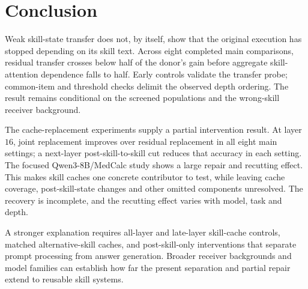 \section{Conclusion}
\label{sec:discussion}

Weak skill-state transfer does not, by itself, show that the original
execution has stopped depending on its skill text. Across eight completed main
comparisons, residual transfer crosses below half of the donor's gain
before aggregate skill-attention dependence falls to half. Early controls
validate the transfer probe; common-item and threshold checks delimit the
observed depth ordering. The result remains conditional on the screened
populations and the wrong-skill receiver background.

The cache-replacement experiments supply a partial intervention result.
At layer $16$, joint replacement improves over residual replacement in
all eight main settings; a next-layer post-skill-to-skill cut reduces that
accuracy in each setting. The focused Qwen3-8B/MedCalc study shows a large
repair and recutting effect. This makes skill
caches one concrete contributor to test, while leaving cache coverage,
post-skill-state changes and other omitted components unresolved. The recovery
is incomplete, and the recutting effect varies with model, task and depth.

A stronger explanation requires all-layer and late-layer skill-cache
controls, matched alternative-skill caches, and post-skill-only interventions
that separate prompt processing from answer generation. Broader receiver
backgrounds and model families can establish how far the present
separation and partial repair extend to reusable skill systems.
